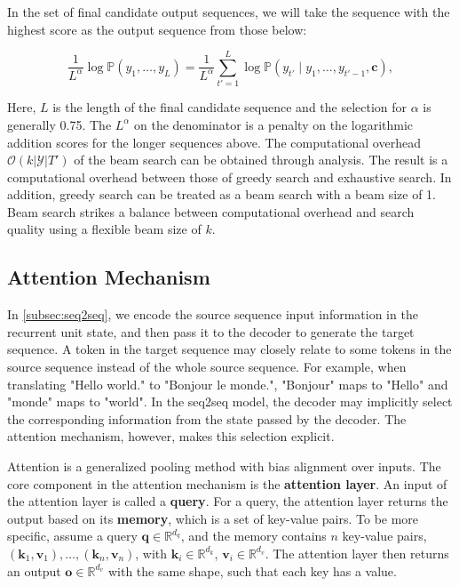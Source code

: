 In the set of final candidate output sequences, we will take the sequence with the highest score as the output sequence from those below:

$$ \frac{1}{L^\alpha} \log \mathbb{P}(y_1, \ldots, y_{L}) = \frac{1}{L^\alpha} \sum_{t'=1}^L \log \mathbb{P}(y_{t'} \mid y_1, \ldots, y_{t'-1}, \boldsymbol{c}),$$

Here, $L$ is the length of the final candidate sequence and the selection for $\alpha$ is generally 0.75. The $L^\alpha$ on the denominator is a penalty on the logarithmic addition scores for the longer sequences above. The computational overhead $\mathcal{O}(k\left|\mathcal{Y}\right|T')$ of the beam search can be obtained through analysis. The result is a computational overhead between those of greedy search and exhaustive search. In addition, greedy search can be treated as a beam search with a beam size of 1. Beam search strikes a balance between computational overhead and search quality using a flexible beam size of $k$.

\subsection{Attention Mechanism}\label{sec:attention}

In \cref{subsec:seq2seq}, we encode the source sequence input information in the recurrent unit state, and then pass it to the decoder to generate the target sequence. A token in the target sequence may closely relate to some tokens in the source sequence instead of the whole source sequence. For example, when translating "Hello world." to "Bonjour le monde.", "Bonjour" maps to "Hello" and "monde" maps to "world". In the seq2seq model, the decoder may implicitly select the corresponding information from the state passed by the decoder. The attention mechanism, however, makes this selection explicit.

Attention is a generalized pooling method with bias alignment over inputs. The core component in the attention mechanism is the \textbf{attention layer}. An input of the attention layer is called a \textbf{query}. For a query, the attention layer returns the output based on its \textbf{memory}, which is a set of key-value pairs. To be more specific, assume a query $\mathbf{q}\in\mathbb R^{d_q}$, and the memory contains $n$ key-value pairs, $(\mathbf{k}_1, \mathbf{v}_1), \ldots, (\mathbf{k}_n, \mathbf{v}_n)$, with $\mathbf{k}_i\in\mathbb R^{d_k}$, $\mathbf{v}_i\in\mathbb R^{d_v}$. The attention layer then returns an output $\mathbf o\in\mathbb R^{d_v}$ with the same shape, such that each key has a value.

